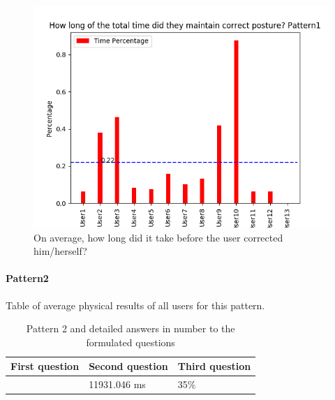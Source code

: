 \documentclass[sigconf]{acmart}
\begin{document}
\begin{figure}[h]
\centering
\includegraphics[width=\columnwidth, scale=1]{p1_q3.png}
\caption{On average, how long did it take before the user corrected him/herself?}
\end{figure}
\pagebreak



\paragraph {\textbf{Pattern2}}
Table of average physical results of all users for this pattern.\\
\begin{table}[htb]
\caption{Pattern 2 and detailed answers in number to the formulated questions}
\label{my-label}
\begin{tabular}{|l|l|l|}
\hline
\multicolumn{1}{|c|}{\textbf{First question}} & \multicolumn{1}{c|}{\textbf{Second question}} & \multicolumn{1}{c|}{\textbf{Third question}} \\ \hline
 [24.0, 26.0, 22.0]& 11931.046 ms & 35\%  \\ \hline
\end{tabular}
\end{table}
\end{document}
